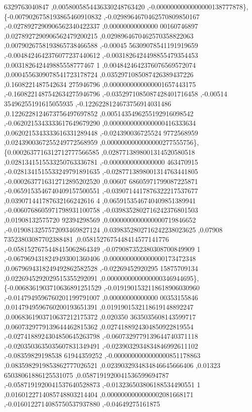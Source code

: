 \begin{DoxyCode}
      6329763040847 ,0.0058005854436330248763420 ,-0.0000000000000000138777878\},
\{-0.0079026758193865460910832 ,-0.0298964670462570809850167 ,-0.0278927290906562340422337 ,0.00000000000000
      00160746897 ,0.0278927290906562479200215 ,0.0298964670462570358822063 ,0.0079026758193865738466588 ,-0.00045
      56309078541191919659 ,-0.0048424642376077237440612 ,-0.0031826424498855479354453 ,0.003182642449885558777467
      1 ,0.0048424642376076569572074 ,0.0004556309078541723178724 ,0.0352971085087426389437226 ,0.1608221487542634
      275946796 ,0.0000000000000001657443175 ,-0.1608221487542634275946796 ,-0.0352971085087428401716458 ,-0.00514
      35496255191615055935 ,-0.1226228124673756914031486 ,0.1226228124673756497697852 ,0.0051435496255192916098542
       ,-0.0620215343333617649679290 ,0.0000000000000000416333634 ,0.0620215343333616331289448 ,-0.024390036725524
      9772568959 ,0.0243900367255249772568959 ,0.0000000000000000277555756\},
\{0.0002637716312712777566585 ,0.0287713898001314520580518 ,0.0281341515533250763336781 ,-0.0000000000000000
      463470915 ,-0.0281341515533249791891635 ,-0.0287713898001314763441805 ,-0.0002637716312712895202520 ,0.00607
      68605971799087225871 ,-0.0659153546740409157500551 ,-0.0390714417876322217537677 ,0.039071441787632166242616
      4 ,0.0659153546740409851389941 ,-0.0060768605971798931100758 ,-0.0398352802716242376801503 ,0.01908132575720
      92394298569 ,0.0000000000000000719846652 ,-0.0190813257572093469827124 ,0.0398352802716242238023625 ,0.07908
      73523803087702388481 ,0.0581527675448414577141776 ,-0.0581527675448415062864349 ,-0.079087352380308700849909
      1 ,-0.0679694318249493001360406 ,0.0000000000000000173472348 ,0.0679694318249492862582528 ,-0.02269452920295
      15875709134 ,0.0226945292029515355292091 ,0.0000000000000000346944695\},
\{-0.0068361903710636891251529 ,-0.0191901532118618906030960 ,-0.0147949596760201199791007 ,0.00000000000000
      00353155846 ,0.0147949596760200193651391 ,0.0191901532118619148892247 ,0.0068361903710637212175372 ,0.020350
      3635035608143599717 ,0.0607329779139644462815362 ,0.0274188924304850922819554 ,-0.0274188924304850645263798 
      ,-0.0607329779139644740371118 ,-0.0203503635035607831349491 ,-0.0239032934834846992611102 ,-0.08359829198538
      61944359252 ,-0.0000000000000000851178863 ,0.0835982919853862777026521 ,0.0239032934834846645666406 ,0.01323
      65038061886125531075 ,0.0587191920041536599694787 ,-0.0587191920041537640528873 ,-0.013236503806188534490551
      1 ,0.0160122714085748803214404 ,0.0000000000000002081668171 ,-0.0160122714085750537937880 ,-0.04649275161875

\end{DoxyCode}
